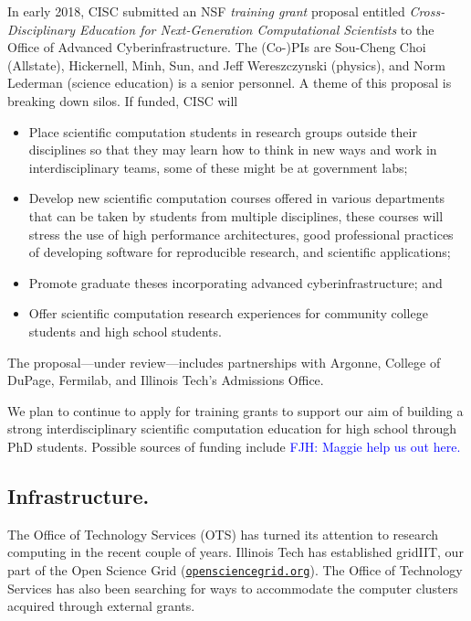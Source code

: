 \documentclass[12pt]{amsart}
\newcommand{\FJHNote}[1]{{\textcolor{blue}{FJH: #1}}}
\begin{document}
In early 2018, CISC submitted an NSF \emph{training grant} proposal entitled \emph{Cross-Disciplinary Education for Next-Generation Computational Scientists} to the Office of Advanced Cyberinfrastructure. The (Co-)PIs are Sou-Cheng Choi (Allstate), Hickernell, Minh, Sun, and Jeff Wereszczynski (physics), and Norm Lederman (science education) is a senior personnel.  A theme of this proposal is breaking down silos.  If funded, CISC will 
\begin{itemize}
    \item Place scientific computation students in research groups outside their disciplines so that they may learn how to think in new ways and work in interdisciplinary teams, some of these might be at government labs;
    
    \item Develop new scientific computation courses offered in various departments that can be taken by students from multiple disciplines, these courses will stress the use of high performance architectures, good professional practices of developing software for reproducible research, and scientific applications;
    
    \item Promote graduate theses incorporating advanced cyberinfrastructure; and
    
    \item Offer scientific computation research experiences for community college students and high school students.

\end{itemize}
The proposal---under review---includes partnerships with Argonne, College of DuPage, Fermilab, and Illinois Tech's Admissions Office.

We plan to continue to apply for training grants to support our aim of building a strong interdisciplinary scientific computation education for high school through PhD students.  Possible sources of funding include \FJHNote{Maggie help us out here.}

\subsection*{Infrastructure.} The Office of Technology Services (OTS) has turned its attention to research computing in the recent couple of years.  Illinois Tech has established gridIIT, our part of the Open Science Grid (\href{http://opensciencegrid.org}{\nolinkurl{opensciencegrid.org}}).  The Office of Technology Services has also been searching for ways to accommodate the computer clusters acquired through external grants.  
\end{document}
